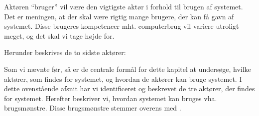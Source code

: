 


Aktøren ``bruger'' vil være den vigtigste aktør i forhold til brugen af systemet. Det er meningen, at der skal være rigtig mange brugere, der kan få gavn af systemet. Disse brugeres kompetencer mht. computerbrug vil variere utroligt meget, og det skal vi tage højde for.

Herunder beskrives de to sidste aktører:





Som vi nævnte før, så er de centrale formål for dette kapitel at undersøge, hvilke aktører, som findes for systemet, og hvordan de aktører kan bruge systemet. I dette ovenstående afsnit har vi identificeret og beskrevet de tre aktører, der findes for systemet. Herefter beskriver vi, hvordan systemet kan bruges vha. brugsmønstre. Disse brugsmønstre stemmer overens med .